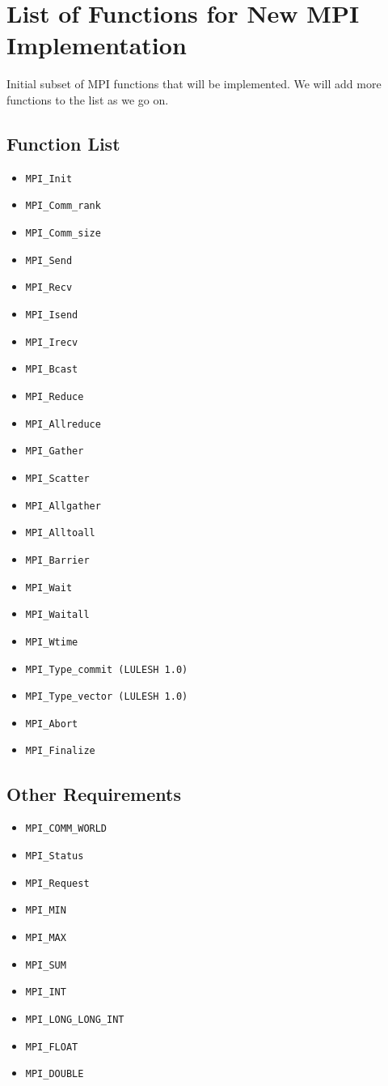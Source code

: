 \documentclass{article}
\newcommand{\itemtt}[1]{\item \texttt{#1}}
\begin{document}
\section{List of Functions for New MPI Implementation}

Initial subset of MPI functions that will be implemented. We will add more functions to the list as we go on.

\subsection{Function List}
\begin{multicols}{2}
    \begin{itemize}
        \itemtt {MPI\_Init}
        \itemtt {MPI\_Comm\_rank}
        \itemtt {MPI\_Comm\_size}
        \itemtt {MPI\_Send}
        \itemtt {MPI\_Recv}
        \itemtt {MPI\_Isend}
        \itemtt {MPI\_Irecv}
        \itemtt {MPI\_Bcast}
        \itemtt {MPI\_Reduce}
        \itemtt {MPI\_Allreduce}
        \itemtt {MPI\_Gather}
        \itemtt {MPI\_Scatter}
        \itemtt {MPI\_Allgather}
        \itemtt {MPI\_Alltoall}
        \itemtt {MPI\_Barrier}
        \itemtt {MPI\_Wait}
        \itemtt {MPI\_Waitall}
        \itemtt {MPI\_Wtime}
        \itemtt {MPI\_Type\_commit (LULESH 1.0)}
        \itemtt {MPI\_Type\_vector (LULESH 1.0)}
        \itemtt {MPI\_Abort}
        \itemtt {MPI\_Finalize}
    \end{itemize}
    \end{multicols}
    
    \subsection{Other Requirements}
    \begin{multicols}{2}
    \begin{itemize}
        \itemtt {MPI\_COMM\_WORLD}
        \itemtt {MPI\_Status}
        \itemtt {MPI\_Request}
        \itemtt {MPI\_MIN}
        \itemtt {MPI\_MAX}
        \itemtt {MPI\_SUM}
        \itemtt {MPI\_INT}
        \itemtt {MPI\_LONG\_LONG\_INT}
        \itemtt {MPI\_FLOAT}
        \itemtt {MPI\_DOUBLE}
    \end{itemize}
    \end{multicols}
\end{document}
